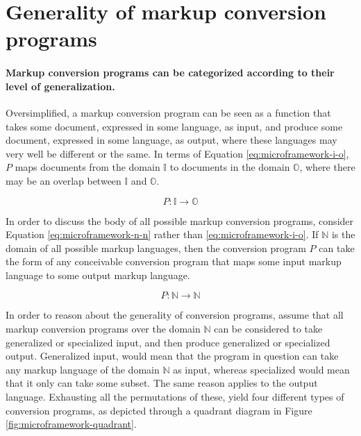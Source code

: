 \documentclass{scrreprt}
\begin{document}
\section{Generality of markup conversion programs}
\label{sec:theory-of-document-processing}
\label{sec:microframework}
\paragraph{Markup conversion programs can be categorized according to their level of generalization.} Oversimplified, a markup conversion program can be seen as a function that takes some document, expressed in some language, as input, and produce some document, expressed in some language, as output, where these languages may very well be different or the same. In terms of Equation \ref{eq:microframework-i-o}, $P$ maps documents from the domain $\mathbb{I}$ to documents in the domain $\mathbb{O}$, where there may be an overlap between $\mathbb{I}$ and $\mathbb{O}$.

\begin{equation}
  P : \mathbb{I} \rightarrow \mathbb{O}
  \label{eq:microframework-i-o}
\end{equation}

In order to discuss the body of all possible markup conversion programs, consider Equation \ref{eq:microframework-n-n} rather than \ref{eq:microframework-i-o}. If $\mathbb{N}$ is the domain of all possible markup languages, then the conversion program $P$ can take the form of any conceivable conversion program that maps some input markup language to some output markup language.

\begin{equation}
  P : \mathbb{N} \rightarrow \mathbb{N}
  \label{eq:microframework-n-n}
\end{equation}

In order to reason about the generality of conversion programs, assume that all markup conversion programs over the domain $\mathbb{N}$ can be considered to take generalized or specialized input, and then produce generalized or specialized output. Generalized input, would mean that the program in question can take any markup language of the domain $\mathbb{N}$ as input, whereas specialized would mean that it only can take some subset. The same reason applies to the output language. Exhausting all the permutations of these, yield four different types of conversion programs, as depicted through a quadrant diagram in Figure \ref{fig:microframework-quadrant}.
\end{document}
